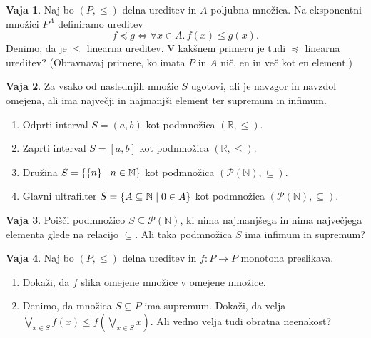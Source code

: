 \documentclass{article}
\newcommand{\all}[1]{\forall #1 .\,}
\newcommand{\NN}{\mathbb{N}}
\newcommand{\RR}{\mathbb{R}}
\theoremstyle{definition}
\newtheorem{vaja}{Vaja}
\begin{document}
\begin{vaja}
  Naj bo $(P, \leq)$ delna ureditev in $A$ poljubna množica. Na eksponentni množici $P^A$ definiramo ureditev
  \begin{equation*}
    f \preceq g \iff \all{x \in A}{f(x) \leq g(x)}.
  \end{equation*}
  Denimo, da je $\leq$ linearna ureditev. V kakšnem primeru je tudi $\preceq$ linearna ureditev? (Obravnavaj primere, ko imata $P$ in $A$ nič, en in več kot en element.)  
\end{vaja}


\begin{vaja}
  Za vsako od naslednjih množic $S$ ugotovi, ali je navzgor in navzdol omejena, ali ima največji in najmanjši element ter supremum in infimum.
  \begin{enumerate}
    \item
      Odprti interval $S = (a,b)$ kot podmnožica $(\RR, \leq)$.
    \item
      Zaprti interval $S = [a,b]$ kot podmnožica $(\RR, \leq)$.
    \item
      Družina $S = \set{\set{n}}{n \in \NN}$ kot podmnožica $(\mathcal{P}(\NN), \subseteq)$.
    \item
      Glavni ultrafilter $S = \set{A \subseteq \NN}{0 \in A}$ kot podmnožica $(\mathcal{P}(\NN), \subseteq)$.
  \end{enumerate}
\end{vaja}

\begin{vaja}
  Poišči podmnožico $S \subseteq \mathcal{P}(\NN)$, ki nima najmanjšega in nima največjega elementa glede na relacijo $\subseteq$. Ali taka podmnožica $S$ ima infimum in supremum?
\end{vaja}

\begin{vaja}
  Naj bo $(P, \leq)$ delna ureditev in $f\colon P \to P$ monotona preslikava.
  \begin{enumerate}
    \item
      Dokaži, da $f$ slika omejene množice v omejene množice.
    \item
      Denimo, da množica $S \subseteq P$ ima supremum. Dokaži, da velja $\bigvee_{x \in S} f(x) \leq f(\bigvee_{x \in S} x)$. Ali vedno velja tudi obratna neenakost?
  \end{enumerate}
\end{vaja}
\end{document}
